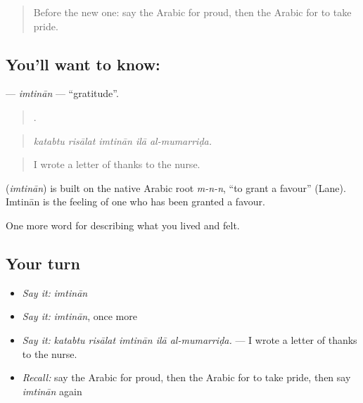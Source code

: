 \label{lesson:AR-C491-imtinan}



\begin{quote}
Before the new one: say the Arabic for proud, then the Arabic for to take pride.
\end{quote}

\subsection*{You'll want to know: }
\textbf{} — \emph{imtinān} — \textquotedblleft{}gratitude\textquotedblright{}.

\begin{quote}
    .
\end{quote}

\begin{quote}
\emph{katabtu risālat imtinān ilā al-mumarriḍa.}
\end{quote}

\begin{quote}
I wrote a letter of thanks to the nurse.
\end{quote}

\begin{cousinweb}
\textbf{} (\emph{imtinān}) is built on the native Arabic root \emph{m-n-n}, \textquotedblleft{}to grant a favour\textquotedblright{} (Lane). Imtinān is the feeling of one who has been granted a favour.
\end{cousinweb}

\begin{grammarlens}[title={What you've built}]
One more word for describing what you lived and felt.
\end{grammarlens}

\subsection*{Your turn}
\begin{itemize}
\raggedright
  \item \emph{Say it:} \emph{imtinān}
  \item \emph{Say it:} \emph{imtinān}, once more
  \item \emph{Say it:} \emph{katabtu risālat imtinān ilā al-mumarriḍa.} — I wrote a letter of thanks to the nurse.
  \item \emph{Recall:} say the Arabic for proud, then the Arabic for to take pride, then say \emph{imtinān} again
\end{itemize}

